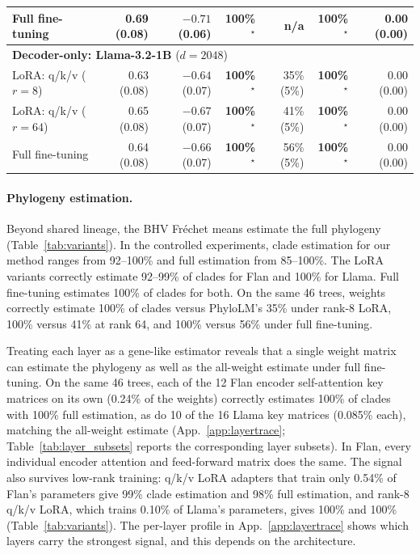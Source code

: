 \documentclass{article}
\theoremstyle{definition}
\theoremstyle{plain}
\begin{document}
\begin{table}[h]
\begin{center}
{\begin{tabular}{lrrrrrr}
\quad Full fine-tuning                  & 0.69 (0.08) & $-0.71$ (0.06) & \textbf{100\%}$^\star$ & n/a & \textbf{100\%}$^\star$ & 0.00 (0.00) \\
\midrule
\multicolumn{7}{l}{\textbf{Decoder-only: Llama-3.2-1B} ($d=2048$)} \\
\quad LoRA: q/k/v ($r{=}8$)              & 0.63 (0.08) & $-0.64$ (0.07) & \textbf{100\%}$^\star$ & 35\% (5\%) & \textbf{100\%}$^\star$ & 0.00 (0.00) \\
\quad LoRA: q/k/v ($r{=}64$)             & 0.65 (0.08) & $-0.67$ (0.07) & \textbf{100\%}$^\star$ & 41\% (5\%) & \textbf{100\%}$^\star$ & 0.00 (0.00) \\
\quad Full fine-tuning                   & 0.64 (0.08) & $-0.66$ (0.07) & \textbf{100\%}$^\star$ & 56\% (5\%) & \textbf{100\%}$^\star$ & 0.00 (0.00) \\
\bottomrule
\end{tabular}
}
\end{center}
\end{table}



\paragraph{Phylogeny estimation.}
\label{sec:results:weighttree}
Beyond shared lineage, the BHV Fr\'echet means estimate the full phylogeny (Table~\ref{tab:variants}). In the controlled experiments, clade estimation for our method ranges from 92--100\% and full estimation from 85--100\%. The LoRA variants correctly estimate 92--99\% of clades for Flan and 100\% for Llama. Full fine-tuning estimates 100\% of clades for both. On the same 46 trees, weights correctly estimate 100\% of clades versus PhyloLM's 35\% under rank-8 LoRA, 100\% versus 41\% at rank 64, and 100\% versus 56\% under full fine-tuning.

Treating each layer as a gene-like estimator reveals that a single weight matrix can estimate the phylogeny as well as the all-weight estimate under full fine-tuning. On the same 46 trees, each of the 12 Flan encoder self-attention key matrices on its own (0.24\% of the weights) correctly estimates 100\% of clades with 100\% full estimation, as do 10 of the 16 Llama key matrices (0.085\% each), matching the all-weight estimate (App.~\ref{app:layertrace}; Table~\ref{tab:layer_subsets} reports the corresponding layer subsets). In Flan, every individual encoder attention and feed-forward matrix does the same. The signal also survives low-rank training: q/k/v LoRA adapters that train only 0.54\% of Flan's parameters give 99\% clade estimation and 98\% full estimation, and rank-8 q/k/v LoRA, which trains 0.10\% of Llama's parameters, gives 100\% and 100\% (Table~\ref{tab:variants}). The per-layer profile in App.~\ref{app:layertrace} shows which layers carry the strongest signal, and this depends on the architecture.
\end{document}
